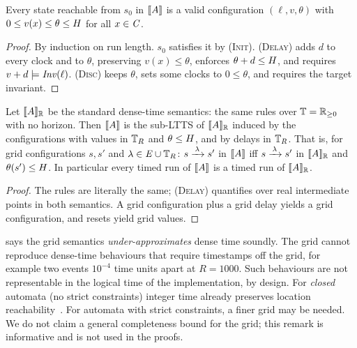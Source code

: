 \begin{lemma}\label{lem:wf}
Every state reachable from $s_0$ in $\llbracket A \rrbracket$ is a valid configuration
$(\ell,v,\theta)$ with $0\le v(x)\le\theta\le H$ for all $x\in\mathit{C}$.
\end{lemma}
\begin{proof}
By induction on run length. $s_0$ satisfies it by \textsc{(Init)}. \textsc{(Delay)}
adds $d$ to every clock and to $\theta$, preserving $v(x)\le\theta$, enforces
$\theta+d\le H$, and requires $v+d\models\mathit{Inv}(\ell)$. \textsc{(Disc)} keeps $\theta$, sets
some clocks to $0\le\theta$, and requires the target invariant.
\end{proof}

\begin{proposition}\label{prop:dense}
Let $\llbracket A \rrbracket_{\mathbb{R}}$ be the standard dense-time semantics: the same rules over
$\mathbb{T}=\mathbb{R}_{\geq 0}$ with no horizon. Then $\llbracket A \rrbracket$ is the sub-LTTS of $\llbracket A \rrbracket_{\mathbb{R}}$
induced by the configurations with values in $\mathbb{T}_R$ and $\theta\le H$, and by
delays in $\mathbb{T}_R$. That is, for grid configurations $s,s'$ and $\lambda\in\mathit{E}\cup\mathbb{T}_R$:
$s\xrightarrow{\,\lambda\,}s'$ in $\llbracket A \rrbracket$ iff $s\xrightarrow{\,\lambda\,}s'$ in $\llbracket A \rrbracket_{\mathbb{R}}$ and
$\theta(s')\le H$. In particular every timed run of $\llbracket A \rrbracket$ is a timed run of
$\llbracket A \rrbracket_{\mathbb{R}}$.
\end{proposition}
\begin{proof}
The rules are literally the same; \textsc{(Delay)} quantifies over real
intermediate points in both semantics. A grid configuration plus a grid delay
yields a grid configuration, and resets yield grid values.
\end{proof}

\begin{remark}
 says the grid semantics \emph{under-approximates} dense time
soundly. The grid cannot reproduce dense-time behaviours that require
timestamps off the grid, for example two events $10^{-4}$ time units apart at
$R=1000$. Such behaviours are not representable in the logical time of the
implementation, by design. For \emph{closed} automata (no strict constraints)
integer time already preserves location reachability~\cite{hmp}. For automata
with strict constraints, a finer grid may be needed. We do not claim a general
completeness bound for the grid; this remark is informative and is not used in
the proofs.
\end{remark}
